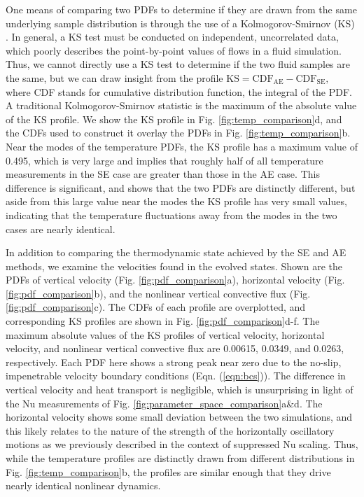\documentclass[aps, pre, onecolumn, nofootinbib, notitlepage, groupedaddress, amsfonts, amssymb, amsmath, longbibliography]{revtex4-1}
\begin{document}
One means of comparing two
PDFs to determine if they are drawn from the same underlying
sample distribution is through the use of a Kolmogorov-Smirnov (KS) \cite{wall&jenkins2012}.
In general, a KS test must be conducted on independent, uncorrelated data, which
poorly describes the point-by-point values of flows in a fluid simulation. Thus,
we cannot directly use a KS test to determine if the two fluid samples are the same,
but we can draw insight from the profile
$\text{KS} = \text{CDF}_{\text{AE}} - \text{CDF}_{\text{SE}},$
where CDF stands for cumulative distribution function, the integral of the PDF.
A traditional Kolmogorov-Smirnov statistic is the maximum of the absolute value of
the KS profile.  We show the KS profile in Fig. \ref{fig:temp_comparison}d, and the
CDFs used to construct it overlay the PDFs in Fig. \ref{fig:temp_comparison}b.
Near the modes of the temperature PDFs, the KS profile has a maximum value of
0.495, which is very large and implies that roughly half of all temperature
measurements in the SE case are greater than those in the AE case.
This difference is significant, and shows that the two PDFs are distinctly different,
but aside from this large value near the modes the KS profile has very small values,
indicating that the temperature fluctuations away from the modes in the two cases are nearly identical.

In addition to comparing the thermodynamic state achieved by the SE and AE methods,
we examine the velocities found in the evolved states.
Shown are the PDFs of 
vertical velocity (Fig. \ref{fig:pdf_comparison}a), horizontal velocity (Fig. \ref{fig:pdf_comparison}b),
and the nonlinear vertical convective flux (Fig. \ref{fig:pdf_comparison}c). 
The CDFs of each profile are overplotted, and corresponding KS profiles are
shown in Fig. \ref{fig:pdf_comparison}d-f.  The maximum absolute values of the
KS profiles of vertical velocity, horizontal velocity, and nonlinear vertical convective flux
are 0.00615, 0.0349, and 0.0263, respectively.  
Each PDF here shows a strong peak near zero due to the no-slip, impenetrable
velocity boundary conditions (Eqn. (\ref{eqn:bcs})).
The difference in vertical velocity
and heat transport is negligible, which is unsurprising in light of
the Nu measurements of Fig. \ref{fig:parameter_space_comparison}a\&d.
The horizontal velocity shows some small deviation between the two simulations, and this
likely relates to the nature of the strength of the horizontally oscillatory motions
as we previously described in the context of suppressed Nu scaling. Thus, while
the temperature profiles are distinctly drawn from different distributions in
Fig. \ref{fig:temp_comparison}b, the profiles are similar enough that they drive
nearly identical nonlinear dynamics.
\end{document}
